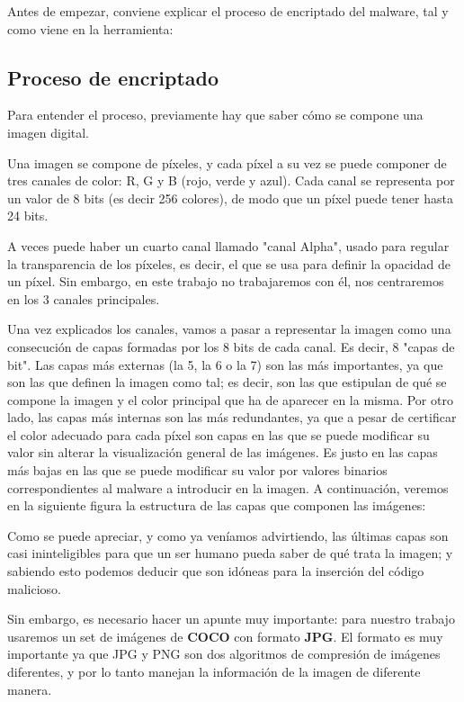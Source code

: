Antes de empezar, conviene explicar el proceso de encriptado del malware, tal y como viene en la herramienta:

\subsection{Proceso de encriptado}

Para entender el proceso, previamente hay que saber cómo se compone una imagen digital.

Una imagen se compone de píxeles, y cada píxel a su vez se puede componer de tres canales de color: R, G y B (rojo, verde y azul). Cada canal se representa por un valor de 8 bits (es decir 256 colores), de modo que un píxel puede tener hasta 24 bits. %

A veces puede haber un cuarto canal llamado "canal Alpha", usado para regular la transparencia de los píxeles, es decir, el que se usa para definir la opacidad de un píxel. Sin embargo, en este trabajo no trabajaremos con él, nos centraremos en los 3 canales principales. %

Una vez explicados los canales, vamos a pasar a representar la imagen como una consecución de capas formadas por los 8 bits de cada canal. Es decir, 8 "capas de bit". Las capas más externas (la 5, la 6 o la 7) son las más importantes, ya que son las que definen la imagen como tal; es decir, son las que estipulan de qué se compone la imagen y el color principal que ha de aparecer en la misma. Por otro lado, las capas más internas son las más redundantes, ya que a pesar de certificar el color adecuado para cada píxel son capas en las que se puede modificar su valor sin alterar la visualización general de las imágenes. Es justo en las capas más bajas en las que se puede modificar su valor por valores binarios correspondientes al malware a introducir en la imagen. A continuación, veremos en la siguiente figura la estructura de las capas que componen las imágenes:


Como se puede apreciar, y como ya veníamos advirtiendo, las últimas capas son casi ininteligibles para que un ser humano pueda saber de qué trata la imagen; y sabiendo esto podemos deducir que son idóneas para la inserción del código malicioso.

Sin embargo, es necesario hacer un apunte muy importante: para nuestro trabajo usaremos un set de imágenes de \textbf{COCO} con formato \textbf{JPG}. El formato es muy importante ya que JPG y PNG son dos algoritmos de compresión de imágenes diferentes, y por lo tanto manejan la información de la imagen de diferente manera. %

